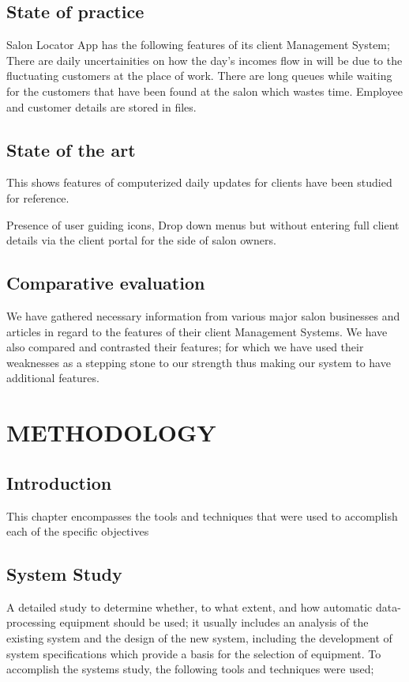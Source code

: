 \documentclass[11pt]{article}
\begin{document}
\subsection*{State of practice}

Salon Locator App has the following features of its client Management System;
There are daily uncertainities on how the day's incomes flow in will be due to the fluctuating customers at the place of work.
There are long queues while waiting for the customers that have been found at the salon  which wastes time.
Employee and customer details are stored in files.


\subsection*{State of the art}

This shows features of computerized daily updates for clients have been studied for reference.
 
Presence of  user guiding icons, Drop down menus but without entering full client details via the client portal for the side of salon owners.

\subsection*{Comparative evaluation}
We have gathered necessary information from various major salon businesses  and articles in regard to the features of their client Management Systems. We have also compared and contrasted their features; for which we have used their weaknesses as a stepping stone to our strength thus making our system to have additional features.

\section {METHODOLOGY}

\subsection*{Introduction}
This chapter encompasses the tools and techniques that were used to accomplish each of the specific objectives

\subsection*{System Study}
A detailed study to determine whether, to what extent, and how automatic data-processing equipment should be used; it usually includes an analysis of the existing system and the design of the new system, including the development of system specifications which provide a basis for the selection of equipment. 
To accomplish the systems study, the following tools and techniques were used;
\end{document}
